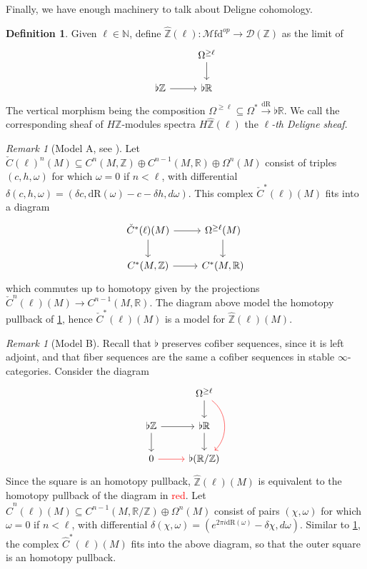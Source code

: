\documentclass[10pt]{amsart}
\newcommand{\D}{\mathscr{D}}
\newcommand{\bN}{\mathbb{N}}
\newcommand{\bR}{\mathbb{R}}
\newcommand{\bZ}{\mathbb{Z}}
\newcommand{\Mfd}{\mathscr{M}\mathrm{fd}}
\newcommand{\dr}{\mathrm{dR}}
\theoremstyle{definition}
\newtheorem{definition}[equation]{Definition}
\theoremstyle{remark}
\newtheorem{remark}[equation]{Remark}
\numberwithin{equation}{section}
\begin{document}
Finally, we have enough machinery to talk about Deligne cohomology. 
\begin{definition}\label{def:deligne}
  Given $\ell\in\bN$, define $\hat{\bZ}(\ell):\Mfd^{op}\to\D(\bZ)$ as the limit of 
  \[\begin{tikzcd}
     & \Omega^{\geq \ell}\arrow[d] \\
    \flat\bZ \arrow[r] & \flat\bR
  \end{tikzcd}\]
  The vertical morphism being the composition $\Omega^{\geq \ell}\subseteq\Omega^*\xrightarrow{\dr}\flat\bR$. We call the corresponding sheaf of $H\bZ$-modules spectra $H\hat{\bZ}(\ell)$ the $\ell$\emph{-th Deligne sheaf}.
\end{definition}
\begin{remark}[Model A, see {\cite[\S 3.2]{hopkinssinger2005diffcoh}}]\label{rmk:A} Let $\check{C}(\ell)^n(M)\subseteq C^n(M,\bZ)\oplus C^{n-1}(M,\bR)\oplus\Omega^n(M)$ consist of triples $(c,h,\omega)$ for which $\omega=0$ if $n<\ell$, with differential $\delta(c,h,\omega)=(\delta c,\dr(\omega)-c-\delta h,d\omega)$. This complex $\check{C}^*(\ell)(M)$ fits into a diagram
\[\begin{tikzcd}
    \check{C}^*(\ell)(M) \arrow[d]\arrow[r] & \Omega^{\geq \ell}(M)\arrow[d] \\
    C^*(M,\bZ) \arrow[r] & C^*(M,\bR)
  \end{tikzcd}\]which commutes up to homotopy given by the projections $\check{C}^n(\ell)(M)\to C^{n-1}(M,\bR)$. The diagram above model the homotopy pullback of \cref{def:deligne}, hence $\check{C}^*(\ell)(M)$ is a model for $\hat{\bZ}(\ell)(M)$. 
\end{remark}
\begin{remark}[Model B]\label{rmk:B} Recall that $\flat$ preserves cofiber sequences, since it is left adjoint, and that fiber sequences are the same a cofiber sequences in stable $\infty$-categories. Consider the diagram
  \[\begin{tikzcd}
     & \Omega^{\geq \ell}\arrow[d]\arrow[dd,bend left=5em,color=red] \\
    \flat\bZ \arrow[r]\arrow[d] & \flat\bR\arrow[d] \\
    0\arrow[r,color=red] & \flat(\bR/\bZ)
  \end{tikzcd}\]
  Since the square is an homotopy pullback, $\hat{\bZ}(\ell)(M)$ is equivalent to the homotopy pullback of the diagram in \textcolor{red}{red}. Let $\hat{C}^{n}(\ell)(M)\subseteq C^{n-1}(M,\bR/\bZ)\oplus\Omega^n(M)$ consist of pairs $(\chi,\omega)$ for which $\omega=0$ if $n<\ell$, with differential $\delta(\chi,\omega)=(e^{2\pi i\dr(\omega)}-\delta\chi,d\omega)$. Similar to \cref{rmk:A}, the complex $\hat{C}^*(\ell)(M)$ fits into the above diagram, so that the outer square is an homotopy pullback.
\end{remark}
\end{document}
